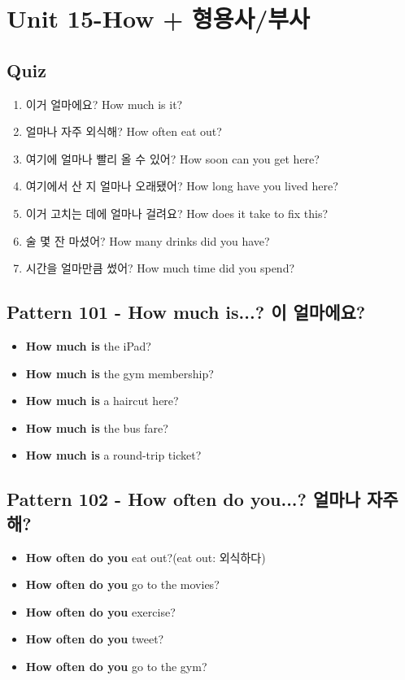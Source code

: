 \documentclass[11pt]{oblivoir}
\begin{document}
\section{Unit 15-How + 형용사/부사}
\subsection{Quiz}
\begin{enumerate}
  \color{black} \item 이거 얼마에요?
    \color{light-gray} How much is it?
  \color{red} \item 얼마나 자주 외식해?
    \color{light-gray} How often eat out?
  \color{red} \item 여기에 얼마나 빨리 올 수 있어?
    \color{light-gray} How soon can you get here?
  \color{black} \item 여기에서 산 지 얼마나 오래됐어?
    \color{light-gray} How long have you lived here?
  \color{black} \item 이거 고치는 데에 얼마나 걸려요?
    \color{light-gray} How does it take to fix this?
  \color{black} \item 술 몇 잔 마셨어?
    \color{light-gray} How many drinks did you have?  
  \color{black} \item 시간을 얼마만큼 썼어?
    \color{light-gray} How much time did you spend?
\end{enumerate}

\subsection{Pattern 101 - How much is...? \texttildelow 이 얼마에요?}
\begin{itemize}
  \item \textbf{How much is} the iPad?
  \item \textbf{How much is} the gym membership?
  \item \textbf{How much is} a haircut here?
  \item \textbf{How much is} the bus fare?
  \item \textbf{How much is} a round-trip ticket?
\end{itemize}

\subsection{Pattern 102 - How often do you...? 얼마나 자주 \texttildelow 해?}
\begin{itemize}
  \item \textbf{How often do you} eat out?(eat out: 외식하다)
  \item \textbf{How often do you} go to the movies?
  \item \textbf{How often do you} exercise?
  \item \textbf{How often do you} tweet?
  \item \textbf{How often do you} go to the gym?
\end{itemize}
\end{document}
